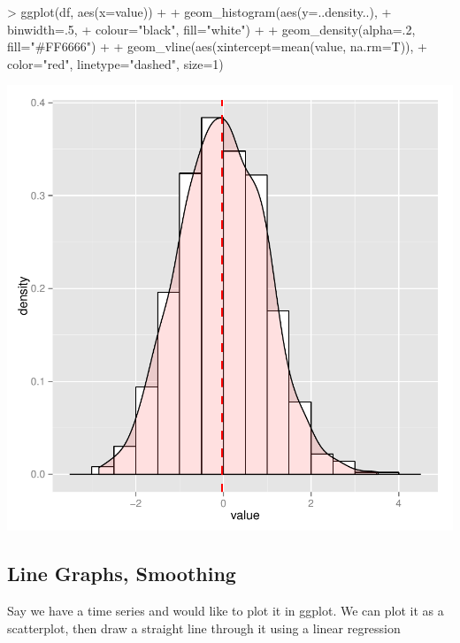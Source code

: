 \documentclass{article}
\begin{document}
\begin{Schunk}
\begin{Sinput}
> ggplot(df, aes(x=value)) + 
+ geom_histogram(aes(y=..density..),
+                binwidth=.5,
+                colour="black", fill="white") +
+ geom_density(alpha=.2, fill="#FF6666") +
+ geom_vline(aes(xintercept=mean(value, na.rm=T)),
+            color="red", linetype="dashed", size=1)
\end{Sinput}
\end{Schunk}
\includegraphics{cookbook-034}

\subsection{Line Graphs, Smoothing}

Say we have a time series and would like to plot it in ggplot.
We can plot it as a scatterplot, then draw a straight line through it
using a linear regression
\end{document}
